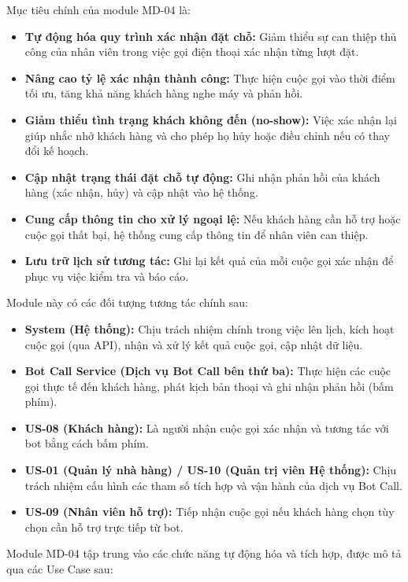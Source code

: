 \label{sssec:md04_objectives_scope}
Mục tiêu chính của module MD-04 là:
\begin{itemize}
    \item \textbf{Tự động hóa quy trình xác nhận đặt chỗ:} Giảm thiểu sự can thiệp thủ công của nhân viên trong việc gọi điện thoại xác nhận từng lượt đặt.
    \item \textbf{Nâng cao tỷ lệ xác nhận thành công:} Thực hiện cuộc gọi vào thời điểm tối ưu, tăng khả năng khách hàng nghe máy và phản hồi.
    \item \textbf{Giảm thiểu tình trạng khách không đến (no-show):} Việc xác nhận lại giúp nhắc nhở khách hàng và cho phép họ hủy hoặc điều chỉnh nếu có thay đổi kế hoạch.
    \item \textbf{Cập nhật trạng thái đặt chỗ tự động:} Ghi nhận phản hồi của khách hàng (xác nhận, hủy) và cập nhật vào hệ thống.
    \item \textbf{Cung cấp thông tin cho xử lý ngoại lệ:} Nếu khách hàng cần hỗ trợ hoặc cuộc gọi thất bại, hệ thống cung cấp thông tin để nhân viên can thiệp.
    \item \textbf{Lưu trữ lịch sử tương tác:} Ghi lại kết quả của mỗi cuộc gọi xác nhận để phục vụ việc kiểm tra và báo cáo.
\end{itemize}

\label{sssec:md04_primary_users}
Module này có các đối tượng tương tác chính sau:
\begin{itemize}
    \item \textbf{System (Hệ thống):} Chịu trách nhiệm chính trong việc lên lịch, kích hoạt cuộc gọi (qua API), nhận và xử lý kết quả cuộc gọi, cập nhật dữ liệu.
    \item \textbf{Bot Call Service (Dịch vụ Bot Call bên thứ ba):} Thực hiện các cuộc gọi thực tế đến khách hàng, phát kịch bản thoại và ghi nhận phản hồi (bấm phím).
    \item \textbf{US-08 (Khách hàng):} Là người nhận cuộc gọi xác nhận và tương tác với bot bằng cách bấm phím.
    \item \textbf{US-01 (Quản lý nhà hàng) / US-10 (Quản trị viên Hệ thống):} Chịu trách nhiệm cấu hình các tham số tích hợp và vận hành của dịch vụ Bot Call.
    \item \textbf{US-09 (Nhân viên hỗ trợ):} Tiếp nhận cuộc gọi nếu khách hàng chọn tùy chọn cần hỗ trợ trực tiếp từ bot.
\end{itemize}

\label{sssec:md04_key_functionalities}
Module MD-04 tập trung vào các chức năng tự động hóa và tích hợp, được mô tả qua các Use Case sau:

